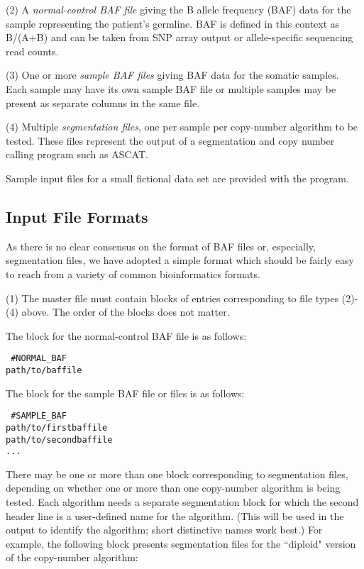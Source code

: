 \documentclass{article}
\begin{document}
(2) A {\it normal-control BAF file} giving the B allele frequency 
(BAF) data for
the sample representing the patient's germline.  BAF is defined in this
context as B/(A+B) and can be taken from SNP array output or
allele-specific sequencing read counts.

(3)  One or more {\it sample BAF files} giving BAF data for the 
somatic samples.  Each sample may have its own sample BAF file
or multiple samples may be present as separate columns in the
same file.

(4)  Multiple {\it segmentation files}, one per sample per
copy-number algorithm to be tested.  These files represent the
output of a segmentation and copy number calling program such
as ASCAT.

Sample input files for a small fictional data set are provided with the
program.

\subsection*{Input File Formats}

As there is no clear consensus on the format of BAF files or, especially,
segmentation
files, we have adopted a simple format which should be fairly easy
to reach from a variety of common bioinformatics formats.

(1) The master file must contain blocks of entries corresponding
to file types (2)-(4) above.  The order of the blocks does not
matter.

The block for the normal-control BAF file is as follows:

{\flushleft
{\tt
\#NORMAL\_BAF \\
path/to/baffile \\
}
}
\bigskip


The block for the sample BAF file or files is as follows:

{\flushleft
{\tt
\#SAMPLE\_BAF \\
path/to/firstbaffile \\
path/to/secondbaffile \\
... \\
}
}
\bigskip


There may be one or more than one block corresponding to segmentation
files, depending on whether one or more than one copy-number algorithm
is being tested.  Each algorithm needs a separate segmentation block
for which the second header line is a user-defined name for the
algorithm. (This will be used in the output to identify the algorithm;
short distinctive names work best.)  For example, the following block
presents segmentation files for the ``diploid" version of the copy-number
algorithm:
\end{document}
